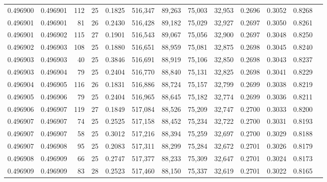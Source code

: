 \begin{tabular}{rrrrrrrrrrrrr}
0.496900 & 0.496901 & 112 &  25 &                                     0.1825 & 516,347 &  89,263 &  75,003 &  32,953 & 0.2696 & 0.3052 & 0.8268 \\
0.496901 & 0.496901 &  81 &  26 &                                     0.2430 & 516,428 &  89,182 &  75,029 &  32,927 & 0.2697 & 0.3050 & 0.8261 \\
0.496901 & 0.496902 & 115 &  27 &                                     0.1901 & 516,543 &  89,067 &  75,056 &  32,900 & 0.2697 & 0.3048 & 0.8250 \\
0.496902 & 0.496903 & 108 &  25 &                                     0.1880 & 516,651 &  88,959 &  75,081 &  32,875 & 0.2698 & 0.3045 & 0.8240 \\
0.496903 & 0.496903 &  40 &  25 &                                     0.3846 & 516,691 &  88,919 &  75,106 &  32,850 & 0.2698 & 0.3043 & 0.8237 \\
0.496903 & 0.496904 &  79 &  25 &                                     0.2404 & 516,770 &  88,840 &  75,131 &  32,825 & 0.2698 & 0.3041 & 0.8229 \\
0.496904 & 0.496905 & 116 &  26 &                                     0.1831 & 516,886 &  88,724 &  75,157 &  32,799 & 0.2699 & 0.3038 & 0.8219 \\
0.496905 & 0.496906 &  79 &  25 &                                     0.2404 & 516,965 &  88,645 &  75,182 &  32,774 & 0.2699 & 0.3036 & 0.8211 \\
0.496906 & 0.496907 & 119 &  27 &                                     0.1849 & 517,084 &  88,526 &  75,209 &  32,747 & 0.2700 & 0.3033 & 0.8200 \\
0.496907 & 0.496907 &  74 &  25 &                                     0.2525 & 517,158 &  88,452 &  75,234 &  32,722 & 0.2700 & 0.3031 & 0.8193 \\
0.496907 & 0.496907 &  58 &  25 &                                     0.3012 & 517,216 &  88,394 &  75,259 &  32,697 & 0.2700 & 0.3029 & 0.8188 \\
0.496907 & 0.496908 &  95 &  25 &                                     0.2083 & 517,311 &  88,299 &  75,284 &  32,672 & 0.2701 & 0.3026 & 0.8179 \\
0.496908 & 0.496909 &  66 &  25 &                                     0.2747 & 517,377 &  88,233 &  75,309 &  32,647 & 0.2701 & 0.3024 & 0.8173 \\
0.496909 & 0.496909 &  83 &  28 &                                     0.2523 & 517,460 &  88,150 &  75,337 &  32,619 & 0.2701 & 0.3022 & 0.8165 \\

\end{tabular}
